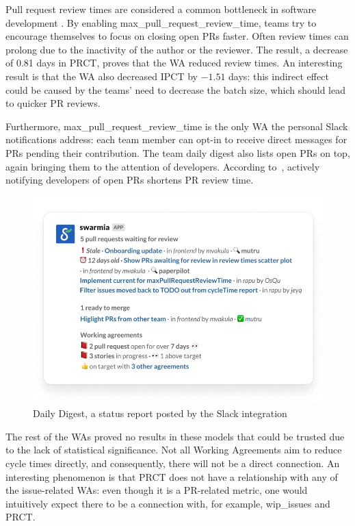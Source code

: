 Pull request review times are considered a common bottleneck in software development \cite{maddila_nudge_2022}. By enabling max\_pull\_request\_review\_time, teams try to encourage themselves to focus on closing open PRs faster. Often review times can prolong due to the inactivity of the author or the reviewer. The result, a decrease of 0.81 days in PRCT, proves that the WA reduced review times. An interesting result is that the WA also decreased IPCT by $-1.51$ days: this indirect effect could be caused by the teams' need to decrease the batch size, which should lead to quicker PR reviews.

Furthermore, max\_pull\_request\_review\_time is the only WA the personal Slack notifications address: each team member can opt-in to receive direct messages for PRs pending their contribution. The team daily digest also lists open PRs on top, again bringing them to the attention of developers. According to~\citet{maddila_nudge_2022}, actively notifying developers of open PRs shortens PR review time.

\begin{figure}[ht]
    \centering
    \includegraphics[width=13.5cm]{LaTeX/images/daily-digest.png}
    \caption{Daily Digest, a status report posted by the Slack integration}
    \label{fig:daily_digest}
\end{figure}

The rest of the WAs proved no results in these models that could be trusted due to the lack of statistical significance. Not all Working Agreements aim to reduce cycle times directly, and consequently, there will not be a direct connection. An interesting phenomenon is that PRCT does not have a relationship with any of the issue-related WAs: even though it is a PR-related metric, one would intuitively expect there to be a connection with, for example, wip\_issues and PRCT. 

